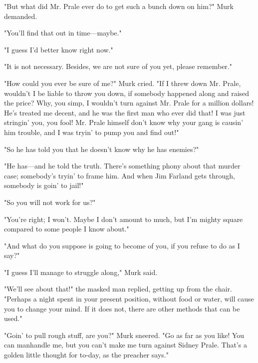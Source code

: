 \documentclass{novel}
\begin{document}
"But what did Mr. Prale ever do to get such a bunch down on him?" Murk demanded.

"You'll find that out in time---maybe."

"I guess I'd better know right now."

"It is not necessary. Besides, we are not sure of you yet, please remember."

"How could you ever be sure of me?" Murk cried. "If I threw down Mr. Prale, wouldn't I be liable to throw you down, if somebody happened along and raised the price? Why, you simp, I wouldn't turn against Mr. Prale for a million dollars! He's treated me decent, and he was the first man who ever did that! I was just stringin' you, you fool! Mr. Prale himself don't know why your gang is causin' him trouble, and I was tryin' to pump you and find out!"

"So he has told you that he doesn't know why he has enemies?"

"He has---and he told the truth. There's something phony about that murder case; somebody's tryin' to frame him. And when Jim Farland gets through, somebody is goin' to jail!"

"So you will not work for us?"

"You're right; I won't. Maybe I don't amount to much, but I'm mighty square compared to some people I know about."

"And what do you suppose is going to become of you, if you refuse to do as I say?"

"I guess I'll manage to struggle along," Murk said.

"We'll see about that!" the masked man replied, getting up from the chair. "Perhaps a night spent in your present position, without food or water, will cause you to change your mind. If it does not, there are other methods that can be used."

"Goin' to pull rough stuff, are you?" Murk sneered. "Go as far as you like! You can manhandle me, but you can't make me turn against Sidney Prale. That's a golden little thought for to-day, as the preacher says."

\vspace{2\nbs}
\clearpage
\thispagestyle{empty}

\begin{ChapterStart}
\vspace{3\nbs}
\end{ChapterStart}
    
\end{document}
